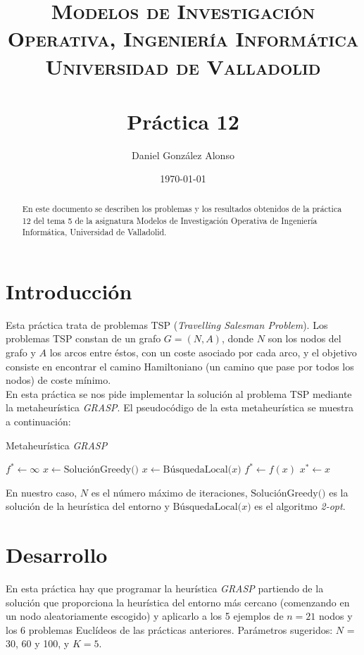\documentclass[a4paper,11pt]{article}
\title{
	\vspace{-25pt}
	\normalfont \Large \textsc{
		Modelos de Investigación Operativa,
        Ingeniería Informática\\
        Universidad de Valladolid
	}\\[10pt]
	\horrule{1pt}\\[10pt]
	\huge \textbf{
		Práctica 12
	}\\
	\horrule{1pt}
}
\author{
	\normalfont \Large Daniel González Alonso
}
\date{
	\normalfont \large \today
}
\let\oldReturn\Return
\renewcommand{\Return}{\State\oldReturn}
\newcommand{\func}{\textrm}
\begin{document}
\maketitle

\begin{abstract}
	En este documento se describen los problemas y los resultados obtenidos de la práctica 12 del tema 5 de la asignatura Modelos de Investigación Operativa de Ingeniería Informática, Universidad de Valladolid.
\end{abstract}

\section{Introducción}
Esta práctica trata de problemas TSP (\textit{Travelling Salesman Problem}). Los problemas TSP constan de un grafo ${G=(N,A)}$, donde ${N}$ son los nodos del grafo y ${A}$ los arcos entre éstos, con un coste asociado por cada arco, y el objetivo consiste en encontrar el camino Hamiltoniano (un camino que pase por todos los nodos) de coste mínimo.\\

En esta práctica se nos pide implementar la solución al problema TSP mediante la metaheurística \textit{GRASP}. El pseudocódigo de la esta metaheurística se muestra a continuación:

\begin{algorithm}[!htbp]
\caption{Metaheurística \textit{GRASP}}
\label{alg_grasp}
\begin{algorithmic}[1]
    \State ${f^{\ast} \gets \infty}$
        \State ${x \gets \func{SoluciónGreedy()}}$
        \State ${x \gets \func{BúsquedaLocal(} x \func{)}}$
            \State ${f^{\ast} \gets f(x)}$
            \State ${x^{\ast} \gets x}$
        \EndIf
    \EndFor
\EndFunction
\end{algorithmic}
\end{algorithm}

En nuestro caso, ${N}$ es el número máximo de iteraciones, ${\func{SoluciónGreedy()}}$ es la solución de la heurística del entorno y ${\func{BúsquedaLocal(} x \func{)}}$ es el algoritmo \textit{2-opt}.

\newpage
\section{Desarrollo}
En esta práctica hay que programar la heurística \textit{GRASP} partiendo de la solución que proporciona la heurística del entorno más cercano (comenzando en un nodo aleatoriamente escogido) y aplicarlo a los 5 ejemplos de ${n=21}$ nodos y los 6 problemas Euclídeos de las prácticas anteriores. Parámetros sugeridos: ${N}$ = 30, 60 y 100, y ${K = 5}$.\\
\end{document}
